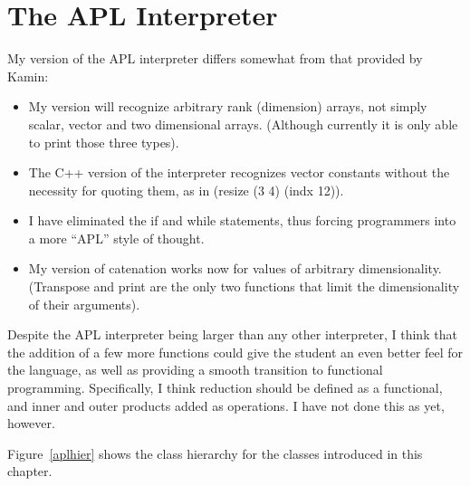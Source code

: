 \chapter{The APL Interpreter}

My version of the APL interpreter differs somewhat from that provided by Kamin:
\begin{itemize}
    \item My version will recognize arbitrary rank (dimension) arrays, not
    simply scalar, vector and two dimensional arrays.  (Although currently it is
    only able to print those three types).
    \item The C++ version of the interpreter recognizes vector constants without
    the necessity for quoting them, as in (resize (3 4) (indx 12)).
    \item I have eliminated the if and while statements, thus forcing
    programmers into a more ``APL'' style of thought.
    \item My version of catenation works now for values of arbitrary
    dimensionality.  (Transpose and print are the only two functions that limit
    the dimensionality of their arguments).
\end{itemize}

Despite the APL interpreter being larger than any other interpreter, I think
that the addition of a few more functions could give the student an even better
feel for the language, as well as providing a smooth transition to functional
programming.  Specifically, I think reduction should be defined as a functional,
and inner and outer products added as operations.  I have not done this as yet,
however.

Figure~\ref{aplhier} shows the class hierarchy for the classes introduced in
this chapter.

